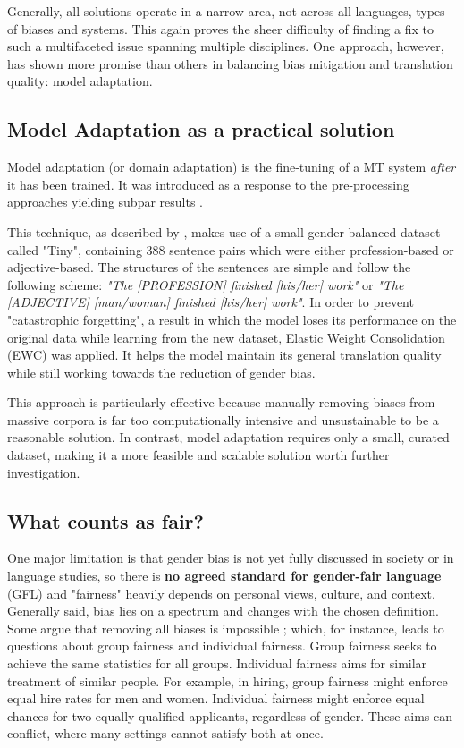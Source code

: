 Generally, all solutions operate in a narrow area, not across all languages, types of biases and systems. This again proves the sheer difficulty of finding a fix to such a multifaceted issue spanning multiple disciplines. One approach, however, has shown more promise than others in balancing bias mitigation and translation quality: model adaptation.

\subsection{Model Adaptation as a practical solution}
Model adaptation (or domain adaptation) is the fine-tuning of a MT system \textit{after} it has been trained. It was introduced as a response to the pre-processing approaches yielding subpar results \parencite{tomalinPracticalEthicsBias2021}.

This technique, as described by \textcite{tomalinPracticalEthicsBias2021}, makes use of a small gender-balanced dataset called "Tiny", containing 388 sentence pairs which were either profession-based or adjective-based. The structures of the sentences are simple and follow the following scheme: \textit{"The [PROFESSION] finished [his/her] work"} or \textit{"The [ADJECTIVE] [man/woman] finished [his/her] work"}. In order to prevent "catastrophic forgetting", a result in which the model loses its performance on the original data while learning from the new dataset, Elastic Weight Consolidation (EWC) was applied. It helps the model maintain its general translation quality while still working towards the reduction of gender bias.

This approach is particularly effective because manually removing biases from massive corpora is far too computationally intensive and unsustainable to be a reasonable solution. In contrast, model adaptation requires only a small, curated dataset, making it a more feasible and scalable solution worth further investigation.

\subsection{What counts as fair?}

One major limitation is that gender bias is not yet fully discussed in society or in language studies, so there is \textbf{no agreed standard for gender-fair language} (GFL) \parencite{lardelliBuildingBridgesDataset2024, savoldiDecadeGenderBias2025} and "fairness" heavily depends on personal views, culture, and context. Generally said, bias lies on a spectrum and changes with the chosen definition. Some argue that removing all biases is impossible \parencite{ullmannGenderBiasMachine2022}; which, for instance, leads to questions about group fairness and individual fairness. Group fairness seeks to achieve the same statistics for all groups. Individual fairness aims for similar treatment of similar people. For example, in hiring, group fairness might enforce equal hire rates for men and women. Individual fairness might enforce equal chances for two equally qualified applicants, regardless of gender. These aims can conflict, where many settings cannot satisfy both at once. 

